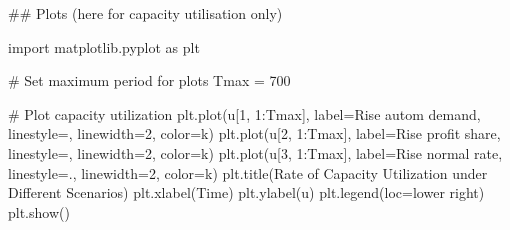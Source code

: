 \documentclass[
  letterpaper,
  DIV=11,
  numbers=noendperiod]{scrreprt}
\newenvironment{Shaded}{\begin{snugshade}}{\end{snugshade}}
\newcommand{\CommentTok}[1]{\textcolor[rgb]{0.37,0.37,0.37}{#1}}
\newcommand{\DecValTok}[1]{\textcolor[rgb]{0.68,0.00,0.00}{#1}}
\newcommand{\ImportTok}[1]{\textcolor[rgb]{0.00,0.46,0.62}{#1}}
\newcommand{\NormalTok}[1]{\textcolor[rgb]{0.00,0.23,0.31}{#1}}
\newcommand{\OperatorTok}[1]{\textcolor[rgb]{0.37,0.37,0.37}{#1}}
\newcommand{\StringTok}[1]{\textcolor[rgb]{0.13,0.47,0.30}{#1}}
\begin{document}
\begin{tcolorbox}[enhanced jigsaw, titlerule=0mm, breakable, bottomrule=.15mm, toprule=.15mm, colbacktitle=quarto-callout-note-color!10!white, rightrule=.15mm, toptitle=1mm, opacityback=0, left=2mm, coltitle=black, title=\textcolor{quarto-callout-note-color}{\faInfo}\hspace{0.5em}{Python code}, colframe=quarto-callout-note-color-frame, opacitybacktitle=0.6, leftrule=.75mm, bottomtitle=1mm, arc=.35mm, colback=white]

\begin{Shaded}
\begin{Highlighting}[]
\CommentTok{\#\# Plots (here for capacity utilisation only)}

\ImportTok{import}\NormalTok{ matplotlib.pyplot }\ImportTok{as}\NormalTok{ plt}

\CommentTok{\# Set maximum period for plots}
\NormalTok{Tmax }\OperatorTok{=} \DecValTok{700}

\CommentTok{\# Plot capacity utilization}
\NormalTok{plt.plot(u[}\DecValTok{1}\NormalTok{, }\DecValTok{1}\NormalTok{:Tmax], label}\OperatorTok{=}\StringTok{\textquotesingle{}Rise autom demand\textquotesingle{}}\NormalTok{, linestyle}\OperatorTok{=}\StringTok{\textquotesingle{}{-}\textquotesingle{}}\NormalTok{, linewidth}\OperatorTok{=}\DecValTok{2}\NormalTok{, color}\OperatorTok{=}\StringTok{\textquotesingle{}k\textquotesingle{}}\NormalTok{)}
\NormalTok{plt.plot(u[}\DecValTok{2}\NormalTok{, }\DecValTok{1}\NormalTok{:Tmax], label}\OperatorTok{=}\StringTok{\textquotesingle{}Rise profit share\textquotesingle{}}\NormalTok{, linestyle}\OperatorTok{=}\StringTok{\textquotesingle{}{-}{-}\textquotesingle{}}\NormalTok{, linewidth}\OperatorTok{=}\DecValTok{2}\NormalTok{, color}\OperatorTok{=}\StringTok{\textquotesingle{}k\textquotesingle{}}\NormalTok{)}
\NormalTok{plt.plot(u[}\DecValTok{3}\NormalTok{, }\DecValTok{1}\NormalTok{:Tmax], label}\OperatorTok{=}\StringTok{\textquotesingle{}Rise normal rate\textquotesingle{}}\NormalTok{, linestyle}\OperatorTok{=}\StringTok{\textquotesingle{}{-}.\textquotesingle{}}\NormalTok{, linewidth}\OperatorTok{=}\DecValTok{2}\NormalTok{, color}\OperatorTok{=}\StringTok{\textquotesingle{}k\textquotesingle{}}\NormalTok{)}
\NormalTok{plt.title(}\StringTok{\textquotesingle{}Rate of Capacity Utilization under Different Scenarios\textquotesingle{}}\NormalTok{)}
\NormalTok{plt.xlabel(}\StringTok{\textquotesingle{}Time\textquotesingle{}}\NormalTok{)}
\NormalTok{plt.ylabel(}\StringTok{\textquotesingle{}u\textquotesingle{}}\NormalTok{)}
\NormalTok{plt.legend(loc}\OperatorTok{=}\StringTok{\textquotesingle{}lower right\textquotesingle{}}\NormalTok{)}
\NormalTok{plt.show()}
\end{Highlighting}
\end{Shaded}

\end{tcolorbox}
\end{document}
